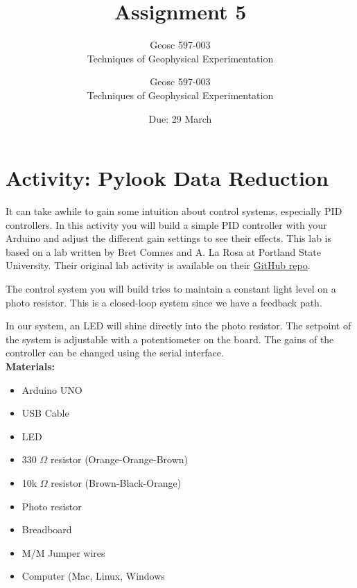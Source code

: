\documentclass[10pt]{article}
\title{Assignment #1} %
\author{Geosc 597-003 \\
		Techniques of Geophysical Experimentation} %
\date{Due: #2}
\newcommand{\titler}[2]{
	\title{Assignment #1} %
	\author{Geosc 597-003 \\
		Techniques of Geophysical Experimentation} %
	\date{Due: #2}
	
	\maketitle}
\begin{document}

\titler{5}{29 March}

\section*{Activity: Pylook Data Reduction}

It can take awhile to gain some intuition about control systems, especially PID controllers. In this activity you will build a simple PID controller with your Arduino and adjust the different gain settings to see their effects. This lab is based on a lab written by Bret Comnes and A. La Rosa at Portland State University. Their original lab activity is available on their \href{https://github.com/bcomnes/315-lab-microcontroller/blob/master/Arduino%2BPID%2BLab.pdf}{GitHub repo}.

The control system you will build tries to maintain a constant light level on a photo resistor. This is a closed-loop system since we have a feedback path. 

In our system, an LED will shine directly into the photo resistor. The setpoint of the system is adjustable with a potentiometer on the board. The gains of the controller can be changed using the serial interface.  \\ 

\noindent \textbf{Materials:}
\begin{multicols}{2}
	{\small \begin{itemize}
		\item Arduino UNO
		\item USB Cable
		\item LED
		\item 330 $ \Omega $ resistor (Orange-Orange-Brown)
		\item 10k $ \Omega $ resistor (Brown-Black-Orange)
		\item Photo resistor
		\item Breadboard
		\item M/M Jumper wires
		\item Computer (Mac, Linux, Windows
	\end{itemize}}
\end{multicols}
\end{document}
